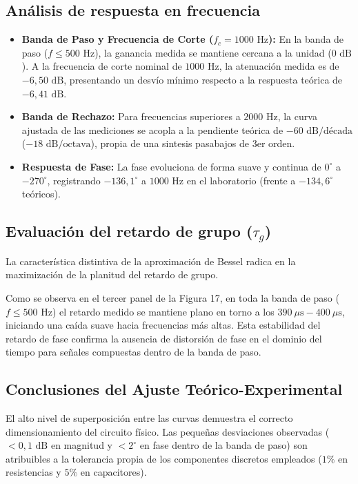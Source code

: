 \documentclass[12pt]{article}
\begin{document}
\begin{itemize}
\subsection{Análisis de respuesta en frecuencia}
\begin{itemize}
    \item \textbf{Banda de Paso y Frecuencia de Corte ($f_c = 1000\text{ Hz}$):} En la banda de paso ($f \le 500\text{ Hz}$), la ganancia medida se mantiene cercana a la unidad ($0\text{ dB}$). A la frecuencia de corte nominal de $1000\text{ Hz}$, la atenuación medida es de $-6,50\text{ dB}$, presentando un desvío mínimo respecto a la respuesta teórica de $-6,41\text{ dB}$.
    \item \textbf{Banda de Rechazo:} Para frecuencias superiores a $2000\text{ Hz}$, la curva ajustada de las mediciones se acopla a la pendiente teórica de $-60\text{ dB/década}$ ($-18\text{ dB/octava}$), propia de una sintesis pasabajos de 3er orden.
    \item \textbf{Respuesta de Fase:} La fase evoluciona de forma suave y continua de $0^\circ$ a $-270^\circ$, registrando $-136,1^\circ$ a $1000\text{ Hz}$ en el laboratorio (frente a $-134,6^\circ$ teóricos).
\end{itemize}

\subsection{Evaluación del retardo de grupo ($\tau_g$)}
La característica distintiva de la aproximación de Bessel radica en la maximización de la planitud del retardo de grupo. 

Como se observa en el tercer panel de la Figura 17, en toda la banda de paso ($f \le 500\text{ Hz}$) el retardo medido se mantiene plano en torno a los $390\ \mu\text{s} - 400\ \mu\text{s}$, iniciando una caída suave hacia frecuencias más altas. Esta estabilidad del retardo de fase confirma la ausencia de distorsión de fase en el dominio del tiempo para señales compuestas dentro de la banda de paso.

\subsection{Conclusiones del Ajuste Teórico-Experimental}
El alto nivel de superposición entre las curvas demuestra el correcto dimensionamiento del circuito físico. Las pequeñas desviaciones observadas ($< 0,1\text{ dB}$ en magnitud y $< 2^\circ$ en fase dentro de la banda de paso) son atribuibles a la tolerancia propia de los componentes discretos empleados ($1\%$ en resistencias y $5\%$ en capacitores).


\end{itemize}
\end{document}
